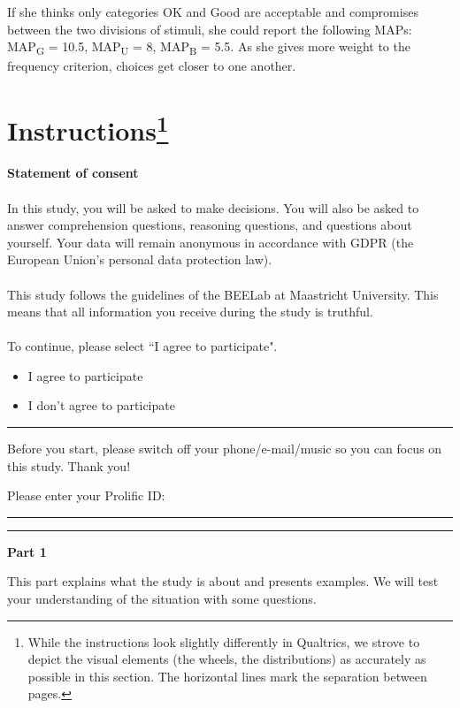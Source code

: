 If she thinks only categories OK and Good are acceptable and compromises between the two divisions of stimuli, she could report the following MAPs: MAP\textsubscript{G} = 10.5, MAP\textsubscript{U} = 8, MAP\textsubscript{B} = 5.5.
As she gives more weight to the frequency criterion, choices get closer to one another.

\newpage
\section[Instructions]{Instructions\footnote{
While the instructions look slightly differently in Qualtrics, we strove to depict the visual elements (the wheels, the distributions) as accurately as possible in this section.
The horizontal lines mark the separation between pages.
}}
\label{section:appendixc}
\setcounter{figure}{0}
\setcounter{table}{0}
\renewcommand{\thefigure}{C.\arabic{figure}}
\renewcommand{\thetable}{C.\arabic{table}}

\textbf{Statement of consent}\\
\\
\noindent In this study, you will be asked to make decisions.
You will also be asked to answer comprehension questions, reasoning questions, and questions about yourself.
Your data will remain anonymous in accordance with GDPR (the European Union's personal data protection law).\\
\\
\noindent This study follows the guidelines of the BEELab at Maastricht University.
This means that all information you receive during the study is truthful.\\
\\
\noindent To continue, please select ``I agree to participate".
\begin{itemize}
\item I agree to participate
\item I don't agree to participate
\end{itemize}

\bigskip
\noindent \rule{\linewidth}{0.4pt}

\noindent Before you start, please switch off your phone/e-mail/music so you can focus on this study.
Thank you!

\noindent Please enter your Prolific ID: \rule{1cm}{0.15mm}

\bigskip
\noindent \rule{\linewidth}{0.4pt}

\noindent \textbf{Part 1}

\noindent This part explains what the study is about and presents examples.
We will test your understanding of the situation with some questions.

